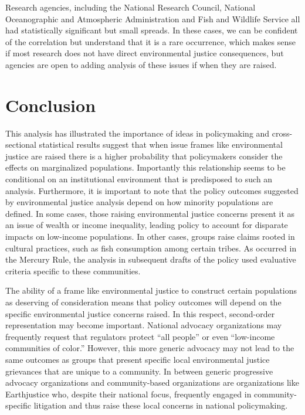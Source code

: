 \documentclass[
      12pt,
        ]{article}
\begin{document}
Research agencies, including the National Research Council, National
Oceanographic and Atmospheric Administration and Fish and Wildlife
Service all had statistically significant but small spreads. In these
cases, we can be confident of the correlation but understand that it is
a rare occurrence, which makes sense if most research does not have
direct environmental justice consequences, but agencies are open to
adding analysis of these issues if when they are raised.

\hypertarget{conclusion}{%
\section{Conclusion}\label{conclusion}}

This analysis has illustrated the importance of ideas in policymaking
and cross-sectional statistical results suggest that when issue frames
like environmental justice are raised there is a higher probability that
policymakers consider the effects on marginalized populations.
Importantly this relationship seems to be conditional on an
institutional environment that is predisposed to such an analysis.
Furthermore, it is important to note that the policy outcomes suggested
by environmental justice analysis depend on how minority populations are
defined. In some cases, those raising environmental justice concerns
present it as an issue of wealth or income inequality, leading policy to
account for disparate impacts on low-income populations. In other cases,
groups raise claims rooted in cultural practices, such as fish
consumption among certain tribes. As occurred in the Mercury Rule, the
analysis in subsequent drafts of the policy used evaluative criteria
specific to these communities.

The ability of a frame like environmental justice to construct certain
populations as deserving of consideration means that policy outcomes
will depend on the specific environmental justice concerns raised. In
this respect, second-order representation may become important. National
advocacy organizations may frequently request that regulators protect
``all people'' or even ``low-income communities of color.'' However, this
more generic advocacy may not lead to the same outcomes as groups that
present specific local environmental justice grievances that are unique
to a community. In between generic progressive advocacy organizations
and community-based organizations are organizations like Earthjustice
who, despite their national focus, frequently engaged in
community-specific litigation and thus raise these local concerns in
national policymaking.
\end{document}
